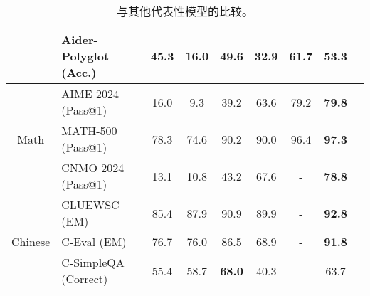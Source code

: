 \begin{table}[h]
\begin{tabular}{@{}c l | c  c  c | c c |c c@{}}
    & Aider-Polyglot {\tiny (Acc.)} & 45.3&16.0& 49.6 & 32.9 & \textbf{61.7}&53.3\\
    \midrule
    \multirow{3}{*}{Math} & AIME 2024 {\tiny (Pass@1)}  & 16.0 & 9.3 & 39.2 & 63.6 & 79.2 & \textbf{79.8} \\
    & MATH-500 {\tiny (Pass@1)} &78.3 & 74.6&90.2 & 90.0 & 96.4 & \textbf{97.3} \\
    & CNMO 2024 {\tiny (Pass@1)} & 13.1 & 10.8 &43.2 & 67.6 & - & \textbf{78.8} \\
    \midrule
    \multirow{3}{*}{Chinese} & CLUEWSC {\tiny (EM)}&  85.4 & 87.9 & 90.9 & 89.9 & - &\textbf{92.8}\\
    & C-Eval {\tiny (EM)} & 76.7 & 76.0 & 86.5 & 68.9 & - & \textbf{91.8}\\
     & C-SimpleQA {\tiny (Correct)}  & 55.4 & 58.7 & \textbf{68.0} & 40.3 & -& 63.7 \\
    \bottomrule
    \end{tabular}
    \caption{ \dsri{} 与其他代表性模型的比较。 }
    \label{tab:main}
\end{table}
